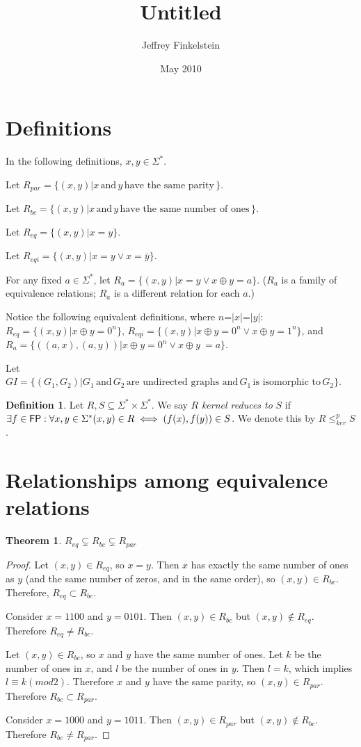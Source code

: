 \documentclass{article}
\author{Jeffrey Finkelstein}
\date{May 2010}
\title{Untitled}
\newtheorem{theorem}{Theorem}[section]
\theoremstyle{definition}
\newtheorem{definition}{Definition}[section]
\newcommand{\plain}[1]{\,\text{#1}\,}
\newcommand{\sigmastar}{\Sigma^{*}}
\newcommand{\kr}{\leq^{p}_{ker}}
\begin{document}
\maketitle
\section{Definitions}

In the following definitions, $x,y\in\sigmastar$.

Let $R_{par}=\{(x,y)|x \plain{and} y \plain{have the same parity}\}$.

Let $R_{bc}=\{(x,y)|x \plain{and} y \plain{have the same number of ones}\}$.

Let $R_{eq}=\{(x,y)|x = y\}$.

Let $R_{eqi}=\{(x,y)|x = y \lor x = \bar{y}\}$.

For any fixed $a\in\sigmastar$, let $R_{a}=\{(x,y)|x = y \lor x \oplus y =
a\}$. ($R_{a}$ is a family of equivalence relations; $R_{a}$ is a different
relation for each $a$.)

Notice the following equivalent definitions, where $n$=$|x|$=$|y|$:
$R_{eq}=\{(x,y)|x \oplus y = 0^n\}$, $R_{eqi}=\{(x,y)|x \oplus y = 0^n \lor x
\oplus y = 1^n\}$, and $R_{a}=\{((a,x),(a,y))|x \oplus y = 0^n \lor x \oplus
y\ = a\}$.

Let $GI=\{(G_1,G_2)|G_1 \plain{and} G_2 \plain{are undirected graphs and} G_1
\plain{is isomorphic to} G_2\}$.

\begin{definition}Let $R,S\subseteq\sigmastar\times\sigmastar$. We say $R$
  \textit{kernel reduces to} $S$ if $\exists f\in\FP:\forall x,y\in\sigmastar
  (x,y)\in R \iff (f(x),f(y))\in S$. We denote this by $R\kr
  S$.\end{definition}

\section{Relationships among equivalence relations}

\begin{theorem}$R_{eq} \subsetneq R_{bc} \subsetneq R_{par}$\end{theorem}
\begin{proof}
  Let $(x,y)\in R_{eq}$, so $x=y$. Then $x$ has exactly the same number of ones
  as $y$ (and the same number of zeros, and in the same order), so $(x,y) \in
  R_{bc}$. Therefore, $R_{eq} \subset R_{bc}$.
 
  Consider $x=1100$ and $y=0101$. Then $(x,y)\in R_{bc}$ but $(x,y) \notin
  R_{eq}$. Therefore $R_{eq} \neq R_{bc}$.

  Let $(x,y)\in R_{bc}$, so $x$ and $y$ have the same number of ones. Let $k$
  be the number of ones in $x$, and $l$ be the number of ones in $y$. Then
  $l=k$, which implies $l \equiv k (mod 2)$. Therefore $x$ and $y$ have the
  same parity, so $(x,y)\in R_{par}$. Therefore $R_{bc} \subset R_{par}$.

  Consider $x=1000$ and $y=1011$. Then $(x,y)\in R_{par}$ but $(x,y) \notin
  R_{bc}$. Therefore $R_{bc} \neq R_{par}$.
\end{proof}
\end{document}
